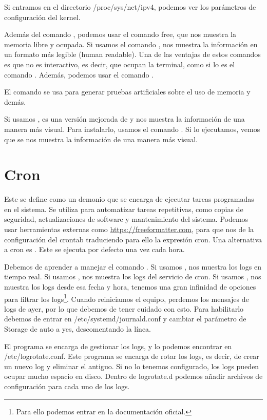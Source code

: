 Si entramos en el directorio /proc/sys/net/ipv4, podemos ver los parámetros de configuración del kernel.

Además del comando , podemos usar el comando free, que nos muestra la memoria libre y ocupada. Si usamos el comando , nos muestra la información en un formato más legible (human readable). Una de las ventajas de estos comandos es que no es interactivo, es decir, que ocupan la terminal, como si lo es el comando . Además, podemos usar el comando .

El comando  se usa para generar pruebas artificiales sobre el uso de memoria y demás.

Si usamos , es una versión mejorada de  y nos muestra la información de una manera más visual. Para instalarlo, usamos el comando . Si lo ejecutamos, vemos que se nos muestra la información de una manera más visual.

\section{Cron}

Este se define como un demonio que se encarga de ejecutar tareas programadas en el sistema. Se utiliza para automatizar tareas repetitivas, como copias de seguridad, actualizaciones de software y mantenimiento del sistema. Podemos usar herramientas externas como \url{https://freeformatter.com}, para que nos de la configuración del crontab traduciendo para ello la expresión cron. Una alternativa a cron es . Este se ejecuta por defecto una vez cada hora.

Debemos de aprender a manejar el comando . Si usamos , nos muestra los logs en tiempo real. Si usamos , nos muestra los logs del servicio de cron. Si usamos , nos muestra los logs desde esa fecha y hora, tenemos una gran infinidad de opciones para filtrar los logs\footnote{Para ello podemos entrar en la documentación oficial.}. Cuando reiniciamos el equipo, perdemos los mensajes de logs de ayer, por lo que debemos de tener cuidado con esto. Para habilitarlo debemos de entrar en /etc/systemd/journald.conf y cambiar el parámetro de Storage de auto a yes, descomentando la línea. 

El programa  se encarga de gestionar los logs, y lo podemos encontrar en /etc/logrotate.conf. Este programa se encarga de rotar los logs, es decir, de crear un nuevo log y eliminar el antiguo. Si no lo tenemos configurado, los logs pueden ocupar mucho espacio en disco. Dentro de logrotate.d podemos añadir archivos de configuración para cada uno de los logs.


